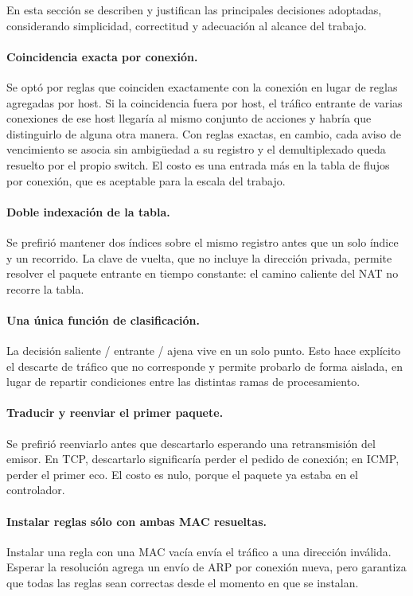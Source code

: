 ﻿\documentclass[10pt,a4paper]{article}
\begin{document}
En esta sección se describen y justifican las principales decisiones adoptadas,
considerando simplicidad, correctitud y adecuación al alcance del trabajo.

\paragraph{Coincidencia exacta por conexión.} Se optó por reglas que coinciden
exactamente con la conexión en lugar de reglas agregadas por host. Si la
coincidencia fuera por host, el tráfico entrante de varias conexiones de ese host
llegaría al mismo conjunto de acciones y habría que distinguirlo de alguna otra
manera. Con reglas exactas, en cambio, cada aviso de vencimiento se asocia sin
ambigüedad a su registro y el demultiplexado queda resuelto por el propio switch. El
costo es una entrada más en la tabla de flujos por conexión, que es aceptable para la
escala del trabajo.

\paragraph{Doble indexación de la tabla.} Se prefirió mantener dos índices sobre el
mismo registro antes que un solo índice y un recorrido. La clave de vuelta, que no
incluye la dirección privada, permite resolver el paquete entrante en tiempo
constante: el camino caliente del NAT no recorre la tabla.

\paragraph{Una única función de clasificación.} La decisión saliente / entrante /
ajena vive en un solo punto. Esto hace explícito el descarte de tráfico que no
corresponde y permite probarlo de forma aislada, en lugar de repartir condiciones
entre las distintas ramas de procesamiento.

\paragraph{Traducir y reenviar el primer paquete.} Se prefirió reenviarlo antes que
descartarlo esperando una retransmisión del emisor. En TCP, descartarlo significaría
perder el pedido de conexión; en ICMP, perder el primer eco. El costo es nulo, porque
el paquete ya estaba en el controlador.

\paragraph{Instalar reglas sólo con ambas MAC resueltas.} Instalar una regla con una
MAC vacía envía el tráfico a una dirección inválida. Esperar la resolución agrega un
envío de ARP por conexión nueva, pero garantiza que todas las reglas sean correctas
desde el momento en que se instalan.
\end{document}
